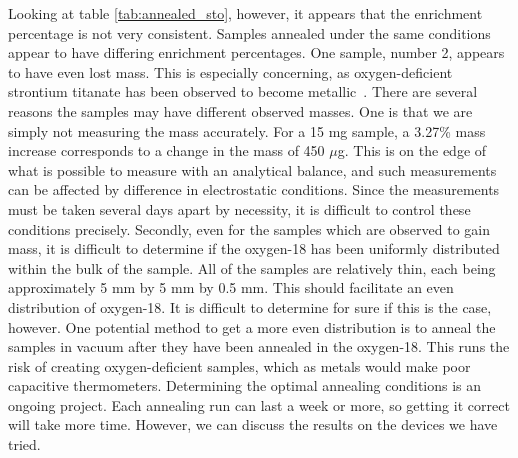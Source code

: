 \documentclass{thesis-umich}
\begin{document}
Looking at table \ref{tab:annealed_sto}, however, it appears that the enrichment percentage is not very consistent. Samples annealed under the same conditions appear to have differing enrichment percentages. One sample, number 2, appears to have even lost mass. This is especially concerning, as oxygen-deficient strontium titanate has been observed to become metallic~\cite{Pallecchi2001}. There are several reasons the samples may have different observed masses. One is that we are simply not measuring the mass accurately. For a 15 mg sample, a 3.27\% mass increase corresponds to a change in the mass of 450 $\mu$g. This is on the edge of what is possible to measure with an analytical balance, and such measurements can be affected by difference in electrostatic conditions. Since the measurements must be taken several days apart by necessity, it is difficult to control these conditions precisely. Secondly, even for the samples which are observed to gain mass, it is difficult to determine if the oxygen-18 has been uniformly distributed within the bulk of the sample. All of the samples are relatively thin, each being approximately 5 mm by 5 mm by 0.5 mm. This should facilitate an even distribution of oxygen-18. It is difficult to determine for sure if this is the case, however. One potential method to get a more even distribution is to anneal the samples in vacuum after they have been annealed in the oxygen-18. This runs the risk of creating oxygen-deficient samples, which as metals would make poor capacitive thermometers. Determining the optimal annealing conditions is an ongoing project. Each annealing run can last a week or more, so getting it correct will take more time. However, we can discuss the results on the devices we have tried.
\end{document}

